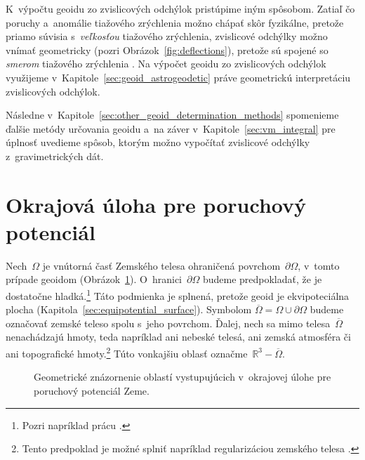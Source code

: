 \documentclass[a4paper, 12pt]{book}
\begin{document}
K~výpočtu geoidu zo zvislicových odchýlok pristúpime iným spôsobom.  Zatiaľ čo 
poruchy a~anomálie tiažového zrýchlenia možno chápať skôr fyzikálne, pretože 
priamo súvisia s~\emph{veľkosťou} tiažového zrýchlenia, zvislicové odchýlky 
možno vnímať geometricky (pozri Obrázok~\ref{fig:deflections}), pretože sú 
spojené so \emph{smerom} tiažového zrýchlenia 
\parencite{MoritzPhysicalGeodesy}.  Na výpočet geoidu zo zvislicových odchýlok 
využijeme v~Kapitole~\ref{sec:geoid_astrogeodetic} práve geometrickú 
interpretáciu zvislicových odchýlok.

Následne v~Kapitole~\ref{sec:other_geoid_determination_methods} spomenieme 
ďalšie metódy určovania geoidu a~na záver v~Kapitole~\ref{sec:vm_integral} pre 
úplnosť uvedieme spôsob, ktorým možno vypočítať zvislicové odchýlky 
z~gravimetrických dát.


\section{Okrajová úloha pre poruchový potenciál}
\label{sec:boundary_value_problem}

Nech~$\Omega$ je vnútorná časť Zemského telesa ohraničená povrchom~$\partial 
\Omega$, v~tomto prípade geoidom (Obrázok~\ref{fig:boundary_value_problems}).  
O~hranici~$\partial \Omega$ budeme predpokladať, že je dostatočne 
hladká.\footnote{Pozri napríklad prácu \textcite{SansoGeoidDetermination}.}  
Táto podmienka je splnená, pretože geoid je ekvipoteciálna plocha 
(Kapitola~\ref{sec:equipotential_surface}).  Symbolom $\overline{\Omega} 
= \Omega \cup \partial\Omega$ budeme označovať zemské teleso spolu s~jeho 
povrchom.  Ďalej, nech sa mimo telesa~$\overline{\Omega}$ nenachádzajú hmoty, 
teda napríklad ani nebeské telesá, ani zemská atmosféra či ani topografické 
hmoty.\footnote{Tento predpoklad je možné splniť napríklad regularizáciou 
zemského telesa \parencite[pozri][]{Janak2006}.}  Túto vonkajšiu oblasť 
označme~$\mathbb{R}^3 - \overline{\Omega}$.

\begin{figure}[bt]
\centering

\caption{Geometrické znázornenie oblastí vystupujúcich v~okrajovej úlohe pre 
poruchový potenciál Zeme.}
\label{fig:boundary_value_problems}
\end{figure}
\end{document}
